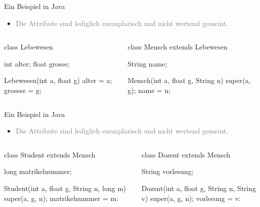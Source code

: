 \begin{frame}[fragile]{Ein Beispiel in Java}
    \begin{itemize}[<+(1)->]
        \item \textcolor{gray}{Die Attribute sind lediglich exemplarisch und nicht wertend gemeint.}
    \end{itemize}
    \pause{}\begin{center}
        \scriptsize%
        \begin{columns}
            \begin{column}{.42\textwidth}
\begin{plainjava}
class Lebewesen {
    int alter;
    float grosse;

    Lebewesen(int a, float g) {
        alter = a;
        groesse = g;
    }
}
\end{plainjava}
            \end{column}\pause{}
            \begin{column}{.5\textwidth}
\begin{plainjava}
class Mensch extends Lebewesen {
    String name;

    Mensch(int a, float g, String n) {
        super(a, g);
        name = n;
    }
}
\end{plainjava}
            \end{column}
        \end{columns}
    \end{center}
\end{frame}

\begin{frame}[fragile]{Ein Beispiel in Java}
    \begin{itemize}[<+(1)->]
        \item<1-> \textcolor{gray}{Die Attribute sind lediglich exemplarisch und nicht wertend gemeint.}
    \end{itemize}
    \pause{}\begin{center}
        \scriptsize%
        \begin{columns}
            \begin{column}{.49\textwidth}
\begin{plainjava}
class Student extends Mensch {
    long matrikelnummer;

    Student(int a, float g, String n,
            long m) {
        super(a, g, n);
        matrikelnummer = m:
    }
}
\end{plainjava}
            \end{column}\pause{}
            \begin{column}{.49\textwidth}
\begin{plainjava}
class Dozent extends Mensch {
    String vorlesung;

    Dozent(int a, float g, String n,
           String v) {
        super(a, g, n);
        vorlesung = v:
    }
}
\end{plainjava}
            \end{column}
        \end{columns}
    \end{center}
\end{frame}

